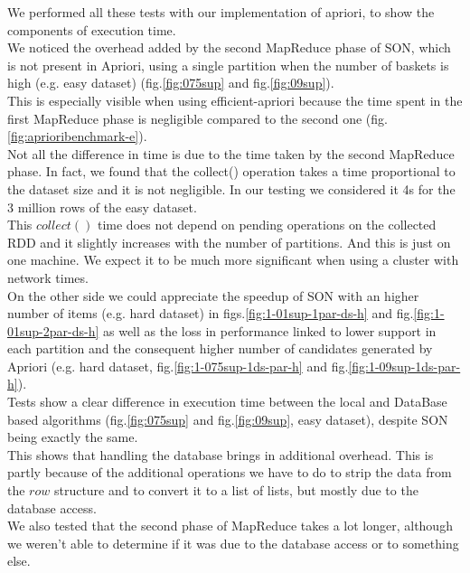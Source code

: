 \documentclass[a4paper]{article}
\begin{document}
	We performed all these tests with our implementation of apriori, to show the components of execution time.\\
	
	We noticed the overhead added by the second MapReduce phase of SON, which is not present in Apriori, using a single partition when the number of baskets is high (e.g. easy dataset) (fig.\ref{fig:075sup} and fig.\ref{fig:09sup}).\\
	This is especially visible when using efficient-apriori because the time spent in the first MapReduce phase is negligible compared to the second one (fig.\ref{fig:aprioribenchmark-e}).\\

	Not all the difference in time is due to the time taken by the second MapReduce phase. In fact, we found that the collect() operation takes a time proportional to the dataset size and it is not
	negligible. In our testing we considered it 4s for the 3 million rows of the easy dataset.\\
	This $collect()$ time does not depend on pending operations on the collected RDD and it slightly increases with the number of partitions. And this is just on one machine. We expect it to be much
	more significant when using a cluster with network times.\\

	On the other side we could appreciate the speedup of SON with an higher number of items (e.g. hard dataset) in figs.\ref{fig:1-01sup-1par-ds-h} and fig.\ref{fig:1-01sup-2par-ds-h}
	as well as the loss in performance linked to lower support in each partition and the consequent higher number of candidates generated by Apriori (e.g. hard dataset, fig.\ref{fig:1-075sup-1ds-par-h} and fig.\ref{fig:1-09sup-1ds-par-h}).\\

	Tests show a clear difference in execution time between the local and DataBase based algorithms (fig.\ref{fig:075sup} and fig.\ref{fig:09sup}, easy dataset), despite SON being exactly the same. \\
	This shows that handling the database brings in additional overhead.
	This is partly because of the additional operations we have to do to strip the data from the $row$ structure and to convert it to a list of lists, but mostly due to the database access.\\	
	We also tested that the second phase of MapReduce takes a lot longer, although we weren't able to determine if it was due to the database access or to something else.\\
	
\end{document}
